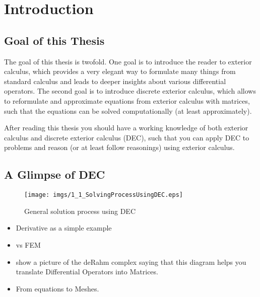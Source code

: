 \chapter{Introduction}
	
	\section{Goal of this Thesis}
	
	The goal of this thesis is twofold. One goal is to introduce the reader to exterior calculus, which provides a very elegant way to formulate many things from standard calculus and leads to deeper insights about various differential operators. The second goal is to introduce discrete exterior calculus, which allows to reformulate and approximate equations from exterior calculus with matrices, such that the equations can be solved computationally (at least approximately). 
	
	After reading this thesis you should have a working knowledge of both exterior calculus and discrete exterior calculus (DEC), such that you can apply DEC to problems and reason (or at least follow reasonings) using exterior calculus. 
	
	

		
	\section{A Glimpse of DEC}
	
	\begin{figure}[h]
	\begin{center}
	\texttt{[image: imgs/1\_1\_SolvingProcessUsingDEC.eps]}
	\end{center}
	\caption{General solution process using DEC}
	\end{figure}
	
	
		\begin{itemize}
			\item Derivative as a simple example 
			\item vs FEM 
			\item show a picture of the deRahm complex saying that this diagram helps you translate Differential Operators into Matrices.
		\end{itemize}
				\begin{itemize}
			\item From equations to Meshes.
		\end{itemize}


